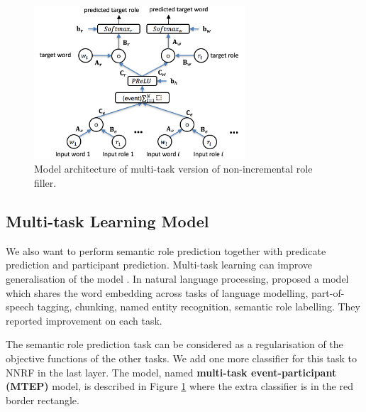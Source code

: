 \documentclass[a4paper]{article}
\begin{document}
\begin{figure}[t]
\centering
\includegraphics[width=0.7\textwidth]{MTRF.png}
\caption{\label{fig:MTEP} Model architecture of multi-task version of non-incremental role filler.}
\end{figure}


\subsection{Multi-task Learning Model} \label{sec:mtl}
We also want to perform semantic role prediction together with predicate prediction and participant prediction. Multi-task learning can improve generalisation of the model \citep{caruana1998multitask}. In natural language processing, \citet{collobert2011natural} proposed a model which shares the word embedding across tasks of language modelling, part-of-speech tagging, chunking, named entity recognition, semantic role labelling. They reported improvement on each task. 

The semantic role prediction task can be considered as a regularisation of the objective functions of the other tasks. We add one more classifier for this task to NNRF in the last layer. The model, named \textbf{multi-task event-participant (MTEP)} model, is described in Figure \ref{fig:MTEP} where the extra classifier is in the red border rectangle. 
\end{document}
